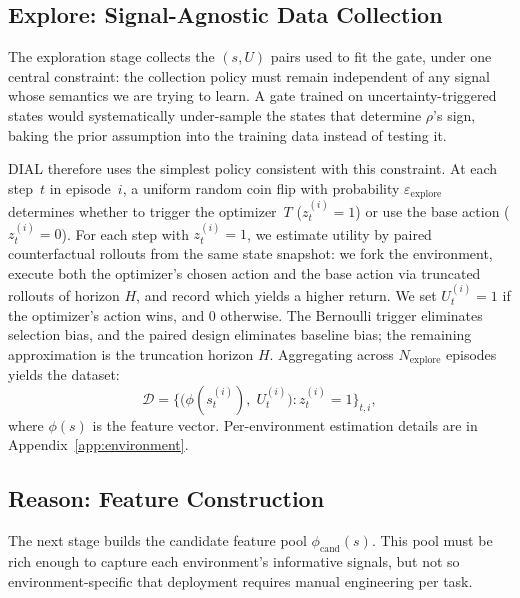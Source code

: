 \subsection{Explore: Signal-Agnostic Data Collection}
\label{sec:explore}
\vspace{-0.05in}
The exploration stage collects the $(s, U)$ pairs used to fit the gate, under one central constraint: the collection policy must remain independent of any signal whose semantics we are trying to learn. A gate trained on uncertainty-triggered states would systematically under-sample the states that determine $\rho$'s sign, baking the prior assumption into the training data instead of testing it.

DIAL therefore uses the simplest policy consistent with this constraint. At each step~$t$ in episode~$i$, a uniform random coin flip with probability $\varepsilon_{\text{explore}}$ determines whether to trigger the optimizer~$T$ ($z_t^{(i)}{=}1$) or use the base action ($z_t^{(i)}{=}0$). For each step with $z_t^{(i)}{=}1$, we estimate utility by paired counterfactual rollouts from the same state snapshot: we fork the environment, execute both the optimizer's chosen action and the base action via truncated rollouts of horizon $H$, and record which yields a higher return. We set $U_t^{(i)} = 1$ if the optimizer's action wins, and $0$ otherwise. The Bernoulli trigger eliminates selection bias, and the paired design eliminates baseline bias; the remaining approximation is the truncation horizon $H$. Aggregating across $N_{\text{explore}}$ episodes yields the dataset:
\begin{equation}
  \mathcal{D} = \bigl\{
    \bigl(\phi(s_t^{(i)}),\; U_t^{(i)}\bigr)
    : z_t^{(i)} = 1
  \bigr\}_{t, i},
  \label{eq:dataset}
\end{equation}
where $\phi(s)$ is the feature vector. Per-environment estimation details are in Appendix~\ref{app:environment}.

\vspace{-0.1in}
\subsection{Reason: Feature Construction}
\label{sec:reason}
\vspace{-0.05in}
The next stage builds the candidate feature pool $\phi_{\text{cand}}(s)$. This pool must be rich enough to capture each environment's informative signals, but not so environment-specific that deployment requires manual engineering per task.

